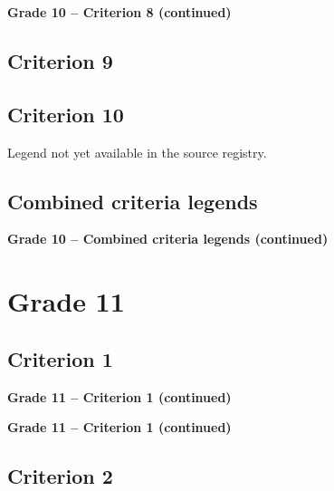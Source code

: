 \noindent\textbf{Grade 10 -- Criterion 8 (continued)}
\PreviewBackToContents



\subsection{Criterion 9}\label{preview:g10c9}
\PreviewBackToContents



\subsection{Criterion 10}\label{preview:g10c10}
Legend not yet available in the source registry.
\PreviewBackToContents


\clearpage
\subsection{Combined criteria legends}
\PreviewBackToContents


\noindent\textbf{Grade 10 -- Combined criteria legends (continued)}
\PreviewBackToContents


\clearpage
\section{Grade 11}
\subsection{Criterion 1}\label{preview:g11c1}


\noindent\textbf{Grade 11 -- Criterion 1 (continued)}


\noindent\textbf{Grade 11 -- Criterion 1 (continued)}
\PreviewBackToContents



\subsection{Criterion 2}\label{preview:g11c2}


